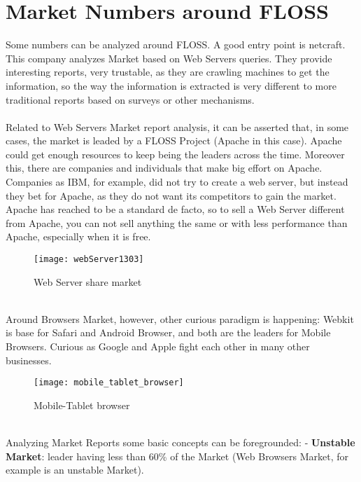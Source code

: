 \section{Market Numbers around FLOSS}\label{MARKET_FLOSS} 
Some numbers can be analyzed around FLOSS. A good entry point is netcraft. This company analyzes Market based on Web Servers queries. They provide interesting reports, very trustable, as they are crawling machines to get the information, so the way the information is extracted is very different to more traditional reports based on surveys or other mechanisms.\\
\\
Related to Web Servers Market report analysis, it can be asserted that, in some cases, the market is leaded by a FLOSS Project (Apache in this case). Apache could get enough resources to keep being the leaders across the time. Moreover this, there are companies and individuals that make big effort on Apache. Companies as IBM, for example, did not try to create a web server, but instead they bet for Apache, as they do not want its competitors to gain the market. Apache has reached to be a standard de facto, so to sell a Web Server different from Apache, you can not sell anything the same or with less performance than Apache, especially when it is free.\\
\begin{figure}[htb]
	\begin{center}
		\texttt{[image: webServer1303]}
		\caption{Web Server share market}
		\label{fig:webServer1303}
	\end{center}
\end{figure}
\\
Around Browsers Market, however, other curious paradigm is happening: Webkit is base for Safari and Android Browser, and both are the leaders for Mobile Browsers. Curious as Google and Apple fight each other in many other businesses.\\
\begin{figure}[htb]
	\begin{center}
		\texttt{[image: mobile\_tablet\_browser]}
		\caption{Mobile-Tablet browser}
		\label{fig:mobile_tablet_browser}
	\end{center}
\end{figure}
\\
Analyzing Market Reports some basic concepts can be foregrounded: 
- \textbf{Unstable Market}: leader having less than 60\% of the Market (Web Browsers Market, for example is an unstable Market).\\
